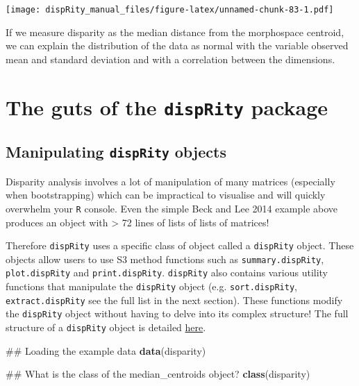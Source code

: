 \documentclass[]{book}
\newenvironment{Shaded}{\begin{snugshade}}{\end{snugshade}}
\newcommand{\KeywordTok}[1]{\textcolor[rgb]{0.13,0.29,0.53}{\textbf{#1}}}
\newcommand{\NormalTok}[1]{#1}
\theoremstyle{definition}
\theoremstyle{definition}
\theoremstyle{remark}
\begin{document}
\texttt{[image: dispRity\_manual\_files/figure-latex/unnamed-chunk-83-1.pdf]}

If we measure disparity as the median distance from the morphospace
centroid, we can explain the distribution of the data as normal with the
variable observed mean and standard deviation and with a correlation
between the dimensions.

\chapter{\texorpdfstring{The guts of the \texttt{dispRity}
package}{The guts of the dispRity package}}\label{the-guts-of-the-disprity-package}

\section{\texorpdfstring{Manipulating \texttt{dispRity}
objects}{Manipulating dispRity objects}}\label{manipulating-disprity-objects}

Disparity analysis involves a lot of manipulation of many matrices
(especially when bootstrapping) which can be impractical to visualise
and will quickly overwhelm your \texttt{R} console. Even the simple Beck
and Lee 2014 example above produces an object with \textgreater{} 72
lines of lists of lists of matrices!

Therefore \texttt{dispRity} uses a specific class of object called a
\texttt{dispRity} object. These objects allow users to use S3 method
functions such as \texttt{summary.dispRity}, \texttt{plot.dispRity} and
\texttt{print.dispRity}. \texttt{dispRity} also contains various utility
functions that manipulate the \texttt{dispRity} object (e.g.
\texttt{sort.dispRity}, \texttt{extract.dispRity} see the full list in
the next section). These functions modify the \texttt{dispRity} object
without having to delve into its complex structure! The full structure
of a \texttt{dispRity} object is detailed
\href{https://github.com/TGuillerme/dispRity/blob/master/disparity_object.md}{here}.

\begin{Shaded}
\begin{Highlighting}[]
\NormalTok{## Loading the example data}
\KeywordTok{data}\NormalTok{(disparity)}

\NormalTok{## What is the class of the median_centroids object?}
\KeywordTok{class}\NormalTok{(disparity)}
\end{Highlighting}
\end{Shaded}
\end{document}
